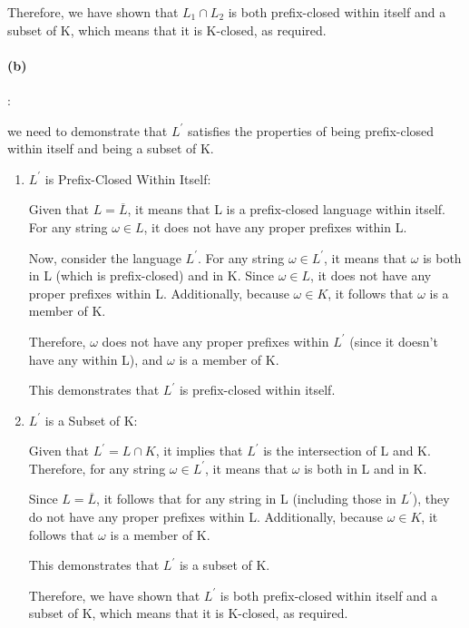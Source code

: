 \documentclass{article}
\begin{document}
Therefore, we have shown that $L_1 \cap L_2$ is both prefix-closed within itself and a subset of K, which means that it is K-closed, as required.

\paragraph{(b)}:

we need to demonstrate that $L^\prime$ satisfies the properties of being prefix-closed within itself and being a subset of K.

\begin{enumerate}
  \item $L^\prime$ is Prefix-Closed Within Itself:
  
  Given that $L = \overline{L}$, it means that L is a prefix-closed language within itself. For any string $\omega \in L$, it does not have any proper prefixes within L.

  Now, consider the language $L^\prime$. For any string $\omega \in L^\prime$, it means that $\omega$ is both in L (which is prefix-closed) and in K. Since $\omega  \in L$, it does not have any proper prefixes within L. Additionally, because $\omega \in K$, it follows that $\omega$ is a member of K.
  
  Therefore, $\omega$ does not have any proper prefixes within $L^\prime$ (since it doesn't have any within L), and $\omega$ is a member of K.
  
  This demonstrates that $L^\prime$ is prefix-closed within itself.

  \item $L^\prime$ is a Subset of K:
  
  Given that $L^\prime = L \cap K$, it implies that $L^\prime$ is the intersection of L and K. Therefore, for any string $\omega \in L^\prime$, it means that $\omega$ is both in L and in K.

  Since $L = \overline{L}$, it follows that for any string in L (including those in $L^\prime$), they do not have any proper prefixes within L. Additionally, because $\omega \in K$, it follows that $\omega$ is a member of K.

  This demonstrates that $L^\prime$ is a subset of K.

  Therefore, we have shown that $L^\prime$ is both prefix-closed within itself and a subset of K, which means that it is K-closed, as required.

\end{enumerate}
\end{document}
